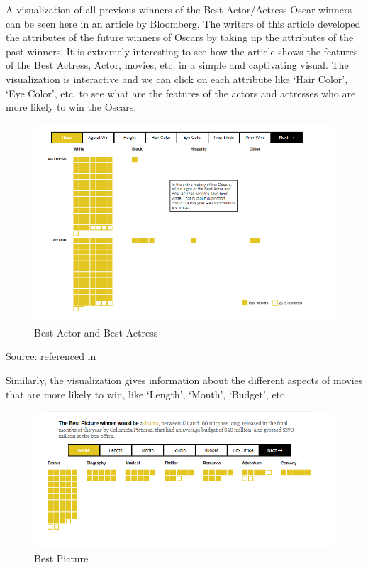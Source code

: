 \documentclass[]{book}
\theoremstyle{definition}
\theoremstyle{definition}
\theoremstyle{definition}
\theoremstyle{remark}
\begin{document}
A visualization of all previous winners of the Best Actor/Actress Oscar
winners can be seen here \citep{oscars_sowhite_chart} in an article by
Bloomberg. The writers of this article developed the attributes of the
future winners of Oscars by taking up the attributes of the past
winners. It is extremely interesting to see how the article shows the
features of the Best Actress, Actor, movies, etc. in a simple and
captivating visual. The visualization is interactive and we can click on
each attribute like `Hair Color', `Eye Color', etc. to see what are the
features of the actors and actresses who are more likely to win the
Oscars.

\begin{figure}
\centering
\includegraphics{images/img_oscars_actors.PNG}
\caption{Best Actor and Best Actress}
\end{figure}

Source: \citep{oscars_sowhite_chart} referenced in \citep{int_viz_2}

Similarly, the visualization gives information about the different
aspects of movies that are more likely to win, like `Length', `Month',
`Budget', etc.

\begin{figure}
\centering
\includegraphics{images/img_oscars_pic.PNG}
\caption{Best Picture}
\end{figure}
\end{document}
